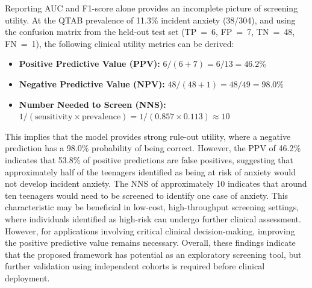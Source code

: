 \documentclass[10pt,letterpaper]{article}
\newcommand{\hlpar}[1]{\leavevmode\colorbox{yellow!30}{\parbox{\dimexpr\linewidth-2\fboxsep\relax}{#1}}\vspace{2pt}}
\begin{document}
                                                                                                          \hlpar{Reporting AUC and F1-score alone provides an incomplete picture of screening utility. At the QTAB prevalence of 11.3\% incident anxiety (38/304), and using the confusion matrix from the held-out test set (TP~=~6, FP~=~7, TN~=~48, FN~=~1), the following clinical utility metrics can be derived:}
                                                                                                          \begin{itemize}
                                                                                                              \item \hlpar{\textbf{Positive Predictive Value (PPV):} $6 / (6 + 7) = 6/13 = 46.2\%$}
                                                                                                              \item \hlpar{\textbf{Negative Predictive Value (NPV):} $48 / (48 + 1) = 48/49 = 98.0\%$}
                                                                                                              \item \hlpar{\textbf{Number Needed to Screen (NNS):} $1 / (\text{sensitivity} \times \text{prevalence}) = 1 / (0.857 \times 0.113) \approx 10$}
                                                                                                          \end{itemize}
                                                                                                          \hlpar{This implies that the model provides strong rule-out utility, where a negative prediction has a 98.0\% probability of being correct. However, the PPV of 46.2\% indicates that 53.8\% of positive predictions are false positives, suggesting that approximately half of the teenagers identified as being at risk of anxiety would not develop incident anxiety. The NNS of approximately 10 indicates that around ten teenagers would need to be screened to identify one case of anxiety. This characteristic may be beneficial in low-cost, high-throughput screening settings, where individuals identified as high-risk can undergo further clinical assessment. However, for applications involving critical clinical decision-making, improving the positive predictive value remains necessary. Overall, these findings indicate that the proposed framework has potential as an exploratory screening tool, but further validation using independent cohorts is required before clinical deployment.}
\end{document}
